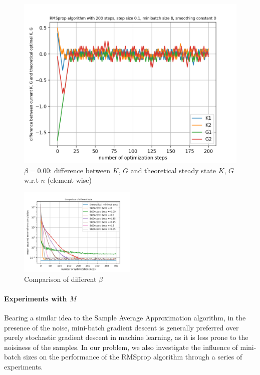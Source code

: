 \documentclass{article}
\begin{document}
\begin{figure}[h!]
\begin{minipage}[t]{.28\paperwidth}
		\includegraphics[width=1.0\textwidth]{Figures/d_beta_0_sep.png}
		\caption{$\beta = 0.00$: difference between $K$, $G$ and theoretical steady state $K$, $G$ w.r.t $n$ (element-wise) \label{fig:d_beta_0_sep}}
	\end{minipage}
\end{figure}
\begin{figure}[h!]
	\centering
	\includegraphics[width=0.5\textwidth]{Figures/comp_beta.png}
	\caption{Comparison of different $\beta$}
	\label{fig:comp_beta}
\end{figure}
\clearpage

\paragraph{Experiments with $M$}
Bearing a similar idea to the Sample Average Approximation algorithm, in the presence of the noise, mini-batch gradient descent is generally preferred over purely stochastic gradient descent in machine learning, as it is less prone to the noisiness of the samples. In our problem, we also investigate the influence of mini-batch sizes on the performance of the RMSprop algorithm through a series of experiments.
\end{document}
